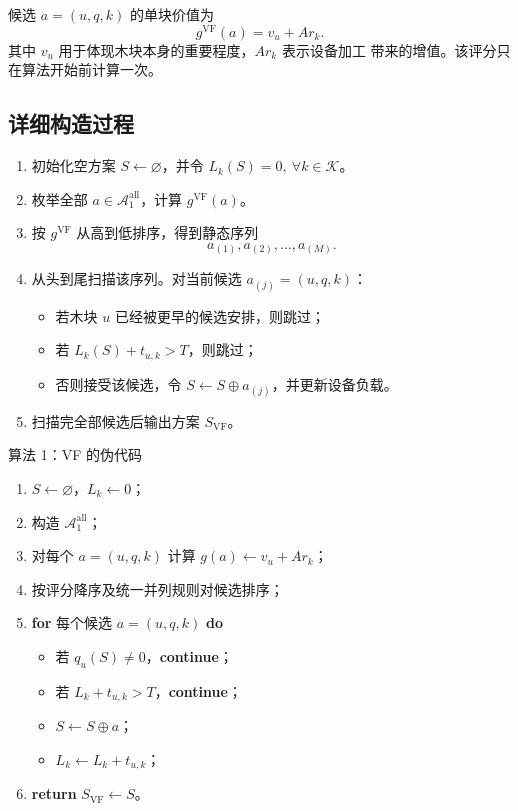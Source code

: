 \documentclass[UTF8,12pt,a4paper]{ctexart}
\newcommand{\Alg}[1]{\textsc{#1}}
\newcommand{\K}{\mathcal{K}}
\newcommand{\Aone}{\mathcal{A}_{1}}
\newcommand{\score}{g}
\newcommand{\load}{L}
\begin{document}
候选 \(a=(u,q,k)\) 的单块价值为
\[
\boxed{
\score^{\mathrm{VF}}(a)
=
v_u+A r_k
}.
\]
其中 \(v_u\) 用于体现木块本身的重要程度，\(A r_k\) 表示设备加工
带来的增值。该评分只在算法开始前计算一次。

\subsection{详细构造过程}

\begin{enumerate}
  \item 初始化空方案 \(S\leftarrow\varnothing\)，并令
        \(\load_k(S)=0,\ \forall k\in\K\)。
  \item 枚举全部 \(a\in\Aone^{\mathrm{all}}\)，计算
        \(\score^{\mathrm{VF}}(a)\)。
  \item 按 \(\score^{\mathrm{VF}}\) 从高到低排序，得到静态序列
        \[
        a_{(1)},a_{(2)},\ldots,a_{(M)}.
        \]
  \item 从头到尾扫描该序列。对当前候选
        \(a_{(j)}=(u,q,k)\)：
        \begin{itemize}
          \item 若木块 \(u\) 已经被更早的候选安排，则跳过；
          \item 若 \(\load_k(S)+t_{u,k}>T\)，则跳过；
          \item 否则接受该候选，令
                \(S\leftarrow S\oplus a_{(j)}\)，并更新设备负载。
        \end{itemize}
  \item 扫描完全部候选后输出方案 \(S_{\mathrm{VF}}\)。
\end{enumerate}

\begin{algobox}{算法 1：\Alg{VF} 的伪代码}
\begin{enumerate}[label=\arabic*.,leftmargin=2.4em]
  \item \(S\leftarrow\varnothing\)，\(\load_k\leftarrow0\)；
  \item 构造 \(\Aone^{\mathrm{all}}\)；
  \item 对每个 \(a=(u,q,k)\) 计算
        \(\score(a)\leftarrow v_u+A r_k\)；
  \item 按评分降序及统一并列规则对候选排序；
  \item \textbf{for} 每个候选 \(a=(u,q,k)\) \textbf{do}
        \begin{itemize}
          \item 若 \(q_u(S)\neq0\)，\textbf{continue}；
          \item 若 \(\load_k+t_{u,k}>T\)，\textbf{continue}；
          \item \(S\leftarrow S\oplus a\)；
          \item \(\load_k\leftarrow\load_k+t_{u,k}\)；
        \end{itemize}
  \item \textbf{return} \(S_{\mathrm{VF}}\leftarrow S\)。
\end{enumerate}
\end{algobox}
\end{document}
